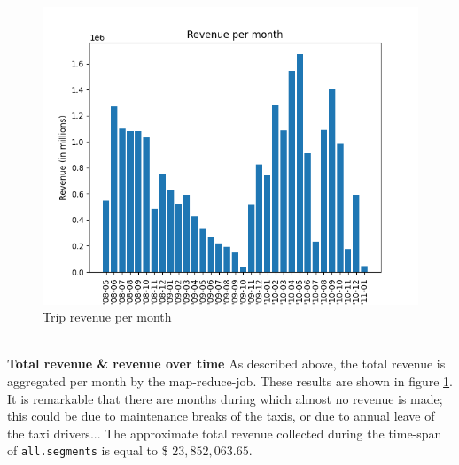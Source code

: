 \documentclass[11pt]{article}
\begin{document}
\begin{figure}
	\includegraphics[width=1.2\linewidth]{./img/revenuePerMonth.png}
	\caption{Trip revenue per month}
	\label{fig:revenue}
\end{figure}

\noindent\\\textbf{Total revenue \& revenue over time}
As described above, the total revenue is aggregated per month by the map-reduce-job. These results are shown in figure \ref{fig:revenue}. It is remarkable that there are months during which almost no revenue is made; this could be due to maintenance breaks of the taxis, or due to annual leave of the taxi drivers... The approximate total revenue collected during the time-span of \texttt{all.segments} is equal to \$ $23,852,063.65$.

\vspace{-.2cm}


\end{document}
